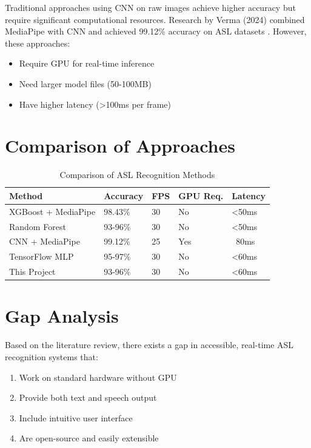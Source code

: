 Traditional approaches using CNN on raw images achieve higher accuracy but require significant computational resources. Research by Verma (2024) combined MediaPipe with CNN and achieved 99.12\% accuracy on ASL datasets \cite{verma2024}. However, these approaches:
\begin{itemize}
    \item Require GPU for real-time inference
    \item Need larger model files (50-100MB)
    \item Have higher latency (>100ms per frame)
\end{itemize}

\vspace{1em}
\section{Comparison of Approaches}

\begin{table}[H]
\centering
\caption{Comparison of ASL Recognition Methods}
\label{tab:comparison}
\begin{tabular}{|L{3.5cm}|C{2cm}|C{2cm}|C{2.5cm}|C{2.5cm}|}
\hline
\textbf{Method} & \textbf{Accuracy} & \textbf{FPS} & \textbf{GPU Req.} & \textbf{Latency} \\
\hline
XGBoost + MediaPipe & 98.43\% & 30 & No & <50ms \\
\hline
Random Forest  & 93-96\% & 30 & No & <50ms \\
\hline
CNN + MediaPipe & 99.12\% & 25 & Yes & ~80ms \\
\hline
TensorFlow MLP & 95-97\% & 30 & No & <60ms \\
\hline
This Project & 93-96\% & 30 & No & <60ms \\
\hline
\end{tabular}
\end{table}

\vspace{1em}
\section{Gap Analysis}

Based on the literature review, there exists a gap in accessible, real-time ASL recognition systems that:

\begin{enumerate}
    \item Work on standard hardware without GPU
    \item Provide both text and speech output
    \item Include intuitive user interface
    \item Are open-source and easily extensible
\end{enumerate}

